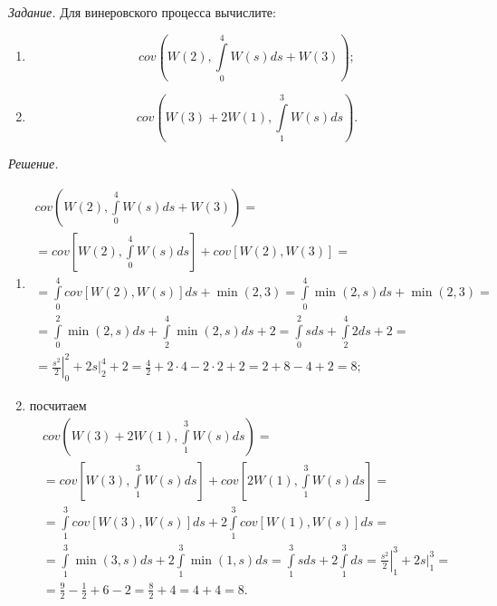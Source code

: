 \textit{Задание.}
Для винеровского процесса вычислите:
\begin{enumerate}[label=\alph*)]
  \item $$cov \left(
      W \left( 2 \right), \int \limits_0^4 W \left( s \right) ds + W \left( 3 \right) \right);$$
  \item $$cov \left(
      W \left( 3 \right) + 2 W \left( 1 \right), \int \limits_1^3 W \left( s \right) ds \right).$$
\end{enumerate}

\textit{Решение.}
\begin{enumerate}[label=\alph*)]
  \item \begin{gather*}
    cov \left(
      W \left( 2 \right), \int \limits_0^4 W \left( s \right) ds + W \left( 3 \right) \right) = \\
    = cov \left[ W \left(2 \right), \int \limits_0^4 W \left( s \right) ds \right] +
    cov \left[ W \left( 2 \right), W \left( 3 \right) \right] = \\
    = \int \limits_0^4 cov \left[ W \left( 2 \right), W \left( s \right) \right] ds +
    \min \left( 2, 3 \right) =
    \int \limits_0^4 \min \left( 2, s \right) ds + \min \left( 2, 3 \right) = \\
    = \int \limits_0^2 \min \left( 2, s \right) ds + \int \limits_2^4 \min \left( 2, s \right) ds +
    2 =
    \int \limits_0^2 sds + \int \limits_2^4 2ds + 2 = \\
    = \left. \frac{s^2}{2} \right|_0^2 + \left. 2s \right|_2^4 + 2 =
    \frac{4}{2} + 2 \cdot 4 - 2 \cdot 2 + 2 =
    2 + 8 - 4 + 2 =
    8;
  \end{gather*}
  \item посчитаем
  \begin{gather*}
    cov \left(
      W \left( 3 \right) + 2 W \left( 1 \right), \int \limits_1^3 W \left( s \right) ds \right) = \\
    = cov \left[ W \left( 3 \right), \int \limits_1^3 W \left( s \right) ds \right] +
    cov \left[ 2W \left( 1 \right), \int \limits_1^3 W \left( s \right) ds \right] = \\
    = \int \limits_1^3 cov \left[ W \left( 3 \right), W \left( s \right) \right] ds +
    2 \int \limits_1^3 cov \left[ W \left( 1 \right), W \left( s \right) \right] ds = \\
    = \int \limits_1^3 \min \left( 3, s \right) ds +
    2 \int \limits_1^3 \min \left( 1, s \right) ds =
    \int \limits_1^3 sds + 2 \int \limits_1^3 ds =
    \left. \frac{s^2}{2} \right|_1^3 + \left. 2s \right|_1^3 = \\
    = \frac{9}{2} - \frac{1}{2} + 6 - 2 =
    \frac{8}{2} + 4 =
    4 + 4 =
    8.
  \end{gather*}
\end{enumerate}

